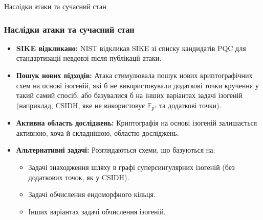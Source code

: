 \documentclass[9pt]{beamer}
\begin{document}
\begin{darkframes}
\begin{frame}{Наслідки атаки та сучасний стан}
  \frametitle{Наслідки атаки та сучасний стан}
  \begin{itemize}
    \item \textbf{SIKE відкликано:} NIST відкликав SIKE зі списку кандидатів PQC для стандартизації невдовзі після публікації атаки.
    \item \textbf{Пошук нових підходів:} Атака стимулювала пошук нових криптографічних схем на основі ізогеній, які б не використовували додаткові точки кручення у такий самий спосіб, або базувалися б на інших варіантах задачі ізогеній (наприклад, CSIDH, яке не використовує $\mathbb{F}_{p^2}$ та додаткові точки).
    \item \textbf{Активна область досліджень:} Криптографія на основі ізогеній залишається активною, хоча й складнішою, областю досліджень.
    \item \textbf{Альтернативні задачі:} Розглядаються схеми, що базуються на:
      \begin{itemize}
        \item Задачі знаходження шляху в графі суперсингулярних ізогеній (без додаткових точок, як у CSIDH).
        \item Задачі обчислення ендоморфного кільця.
        \item Інших варіантах задачі обчислення ізогеній.
      \end{itemize}
  \end{itemize}
\end{frame}



\end{darkframes}
\end{document}
